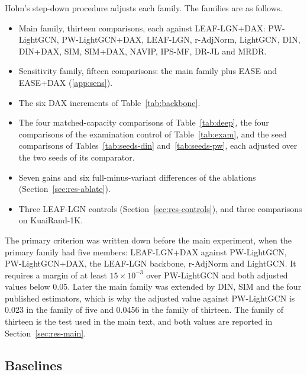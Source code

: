 \documentclass[preprint,12pt,authoryear]{elsarticle}
\begin{document}
Holm's step-down procedure \citep{holm1979} adjusts each family. The families are as follows.
\begin{itemize}
\item Main family, thirteen comparisons, each against LEAF-LGN+DAX: PW-LightGCN, PW-LightGCN+DAX, LEAF-LGN, r-AdjNorm, LightGCN, DIN, DIN+DAX,
  SIM, SIM+DAX, NAVIP, IPS-MF, DR-JL and MRDR.
\item Sensitivity family, fifteen comparisons: the main family plus EASE and EASE+DAX (\ref{app:sens}).
\item The six DAX increments of Table~\ref{tab:backbone}.
\item The four matched-capacity comparisons of Table~\ref{tab:deep}, the four comparisons of the examination control of
  Table~\ref{tab:exam}, and the seed comparisons of Tables~\ref{tab:seeds-din} and~\ref{tab:seeds-pw}, each adjusted over the two seeds of its comparator.
\item Seven gains and six full-minus-variant differences of the ablations (Section~\ref{sec:res-ablate}).
\item Three LEAF-LGN controls (Section~\ref{sec:res-controls}), and three comparisons on KuaiRand-1K.
\end{itemize}
The primary criterion was written down before the main experiment, when the primary family had five members: LEAF-LGN+DAX against PW-LightGCN,
PW-LightGCN+DAX, the LEAF-LGN backbone, r-AdjNorm and LightGCN. It requires a margin of at least $15\times10^{-3}$ over PW-LightGCN and both
adjusted values below 0.05. Later the main family was extended by DIN, SIM and the four published estimators, which is why the adjusted value
against PW-LightGCN is 0.023 in the family of five and 0.0456 in the family of thirteen. The family of thirteen is the test used in the main
text, and both values are reported in Section~\ref{sec:res-main}.

\subsection{Baselines}
\label{sec:protocol-baselines}
\end{document}
